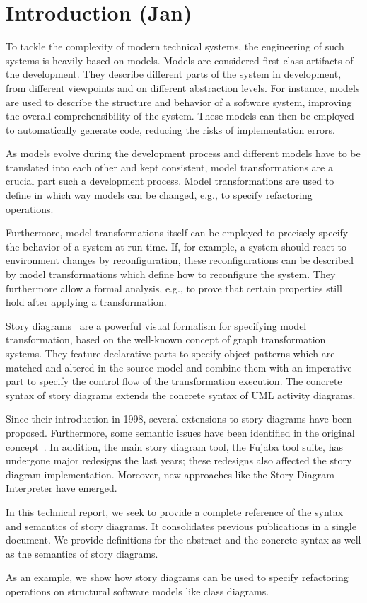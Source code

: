 \chapter{Introduction (Jan)}
To tackle the complexity of modern technical systems, the engineering of such systems is heavily based on models.
Models are considered first-class artifacts of the development.
They describe different parts of the system in development, from different viewpoints and on different abstraction levels.
For instance, models are used to describe the structure and behavior of a software system, improving the overall comprehensibility of the system.
These models can then be employed to automatically generate code, reducing the risks of implementation errors.

As models evolve during the development process and different models have to be translated into each other and kept consistent, model transformations are a crucial part such a development process.
Model transformations are used to define in which way models can be changed, e.g., to specify refactoring operations.

Furthermore, model transformations itself can be employed to precisely specify the behavior of a system at run-time.
If, for example, a system should react to environment changes by reconfiguration, these reconfigurations can be described by model transformations which define how to reconfigure the system.
They furthermore allow a formal analysis, e.g., to prove that certain properties still hold after applying a transformation.

Story diagrams~\cite{ZSW99,FNTZ00,Zun01} are a powerful visual formalism for specifying model transformation, based on the well-known concept of graph transformation systems.
They feature declarative parts to specify object patterns which are matched and altered in the source model and combine them with an imperative part to specify the control flow of the transformation execution.
The concrete syntax of story diagrams extends the concrete syntax of UML activity diagrams.

Since their introduction in 1998, several extensions to story diagrams have been proposed.
Furthermore, some semantic issues have been identified in the original concept~\cite{TMG06}.
In addition, the main story diagram tool, the Fujaba tool suite, has undergone major redesigns the last years; these redesigns also affected the story diagram implementation.
Moreover, new approaches like the Story Diagram Interpreter have emerged.

In this technical report, we seek to provide a complete reference of the syntax and semantics of story diagrams.
It consolidates previous publications in a single document.
We provide definitions for the abstract and the concrete syntax as well as the semantics of story diagrams.

As an example, we show how story diagrams can be used to specify refactoring operations on structural software models like class diagrams.

